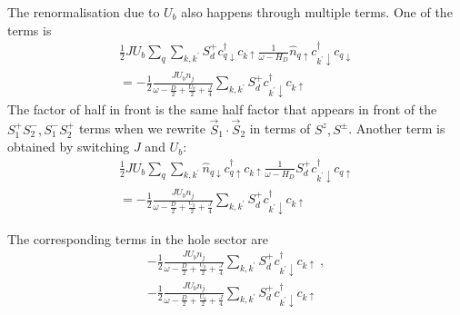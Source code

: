 \documentclass[reprint,superscriptaddress,floatfix]{revtex4-2}
\begin{document}
The renormalisation due to \(U_b\) also happens through multiple terms. One of the terms is
\begin{equation}\begin{aligned}
	\frac{1}{2} J U_b \sum_{q} \sum_{k,k^\prime} S_d^+ c^\dagger_{q \downarrow} c_{k \uparrow} \frac{1}{\omega - H_D} \hat n_{q \uparrow} c^\dagger_{k^\prime \downarrow}c_{q \downarrow} \\
	= -\frac{1}{2}\frac{J U_b n_j}{\omega - \frac{D}{2} + \frac{U_b}{2} + \frac{J}{4}} \sum_{k,k^\prime} S_d^+ c^\dagger_{k^\prime \downarrow} c_{k \uparrow}
\end{aligned}\end{equation}
The factor of half in front is the same half factor that appears in front of the \(S_1^+ S_2^-, S_1^-S_2^+\) terms when we rewrite \(\vec{S}_1\cdot\vec{S}_2\) in terms of \(S^z, S^\pm\). Another term is obtained by switching \(J\) and \(U_b\):
\begin{equation}\begin{aligned}
	\frac{1}{2} J U_b \sum_{q} \sum_{k,k^\prime} \hat n_{q \downarrow} c^\dagger_{q \uparrow} c_{k \uparrow} \frac{1}{\omega - H_D}S_d^+ c^\dagger_{k^\prime \downarrow} c_{q \uparrow} \\
	= -\frac{1}{2}\frac{J U_b n_j}{\omega - \frac{D}{2} + \frac{U_b}{2} + \frac{J}{4}} \sum_{k,k^\prime} S_d^+ c^\dagger_{k^\prime \downarrow} c_{k \uparrow}
\end{aligned}\end{equation}

The corresponding terms in the hole sector are
\begin{equation}\begin{aligned}
	-\frac{1}{2}\frac{J U_b n_j}{\omega - \frac{D}{2} + \frac{U_b}{2} + \frac{J}{4}} \sum_{k,k^\prime} S_d^+ c^\dagger_{k^\prime \downarrow} c_{k \uparrow}~,\\
	-\frac{1}{2}\frac{J U_b n_j}{\omega - \frac{D}{2} + \frac{U_b}{2} + \frac{J}{4}} \sum_{k,k^\prime} S_d^+ c^\dagger_{k^\prime \downarrow} c_{k \uparrow}
\end{aligned}\end{equation}
\end{document}
